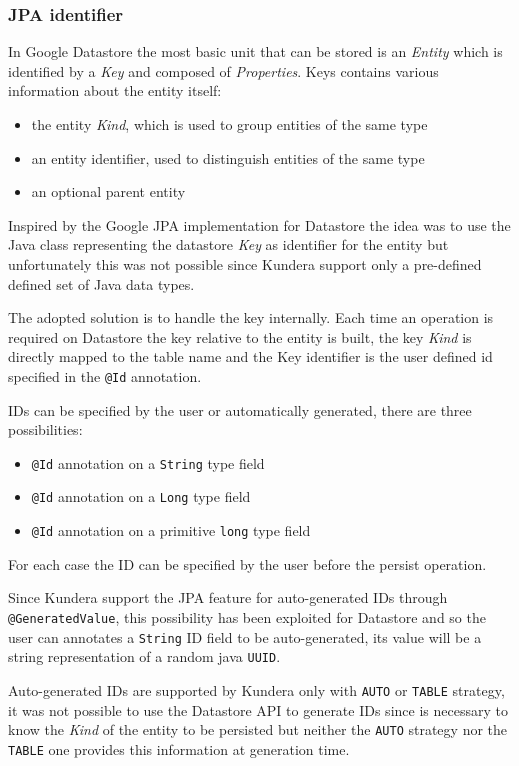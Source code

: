 \subsubsection{JPA identifier}
In Google Datastore the most basic unit that can be stored is an \textit{Entity} which is identified by a \textit{Key} and composed of \textit{Properties}.
Keys contains various information about the entity itself:
\begin{itemize}
\item the entity \textit{Kind}, which is used to group entities of the same type
\item an entity identifier, used to distinguish entities of the same type
\item an optional parent entity 
\end{itemize}
Inspired by the Google JPA implementation for Datastore \cite{online:googlejpa} the idea was to use the Java class representing the datastore \textit{Key} as identifier for the entity but unfortunately this was not possible since Kundera support only a pre-defined defined set of Java data types.

\noindent The adopted solution is to handle the key internally. Each time an operation is required on Datastore the key relative to the entity is built, the key \textit{Kind} is directly mapped to the table name and the Key identifier is the user defined id specified in the \texttt{@Id} annotation.

\newparagraph IDs can be specified by the user or automatically generated, there are three possibilities:
\begin{itemize}
\item \texttt{@Id} annotation on a \texttt{String} type field
\item \texttt{@Id} annotation on a \texttt{Long} type field
\item \texttt{@Id} annotation on a primitive \texttt{long} type field
\end{itemize}
For each case the ID can be specified by the user before the persist operation.

\noindent Since Kundera support the JPA feature for auto-generated IDs through \texttt{@GeneratedValue}, this possibility has been exploited for Datastore and so the user can annotates a \texttt{String} ID field to be auto-generated, its value will be a string representation of a random java \texttt{UUID}.

\noindent Auto-generated IDs are supported by Kundera only with \texttt{AUTO} or \texttt{TABLE} strategy, it was not possible to use the Datastore API to generate IDs since is necessary to know the \textit{Kind} of the entity to be persisted but neither the \texttt{AUTO} strategy nor the \texttt{TABLE} one provides this information at generation time.

